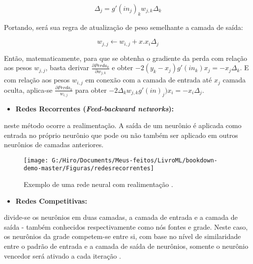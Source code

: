 \documentclass[
  openany]{book}
\providecommand{\tightlist}{%
  \setlength{\itemsep}{0pt}\setlength{\parskip}{0pt}}
\begin{document}
\begin{equation} 
  \Delta_j=g'(in_j)_k w_{j,k} \Delta_k
  \label{eq:deltaj}
\end{equation}

Portando, será sua regra de atualização de peso semelhante a camada de saída:

\begin{equation} 
  w_{j,j}\leftarrow w_{i,j}+x.x_i \Delta_j
  \label{eq:pesoatualizaCAOj}
\end{equation}

Então, matematicamente, para que se obtenha o gradiente da perda com relação aos pesos \(w_{j,j}\), basta derivar \(\frac{\partial Perda_k}{\partial w_{j,k}}\) e obter \(-2(y_k-x_j)g'(in_k)x_j=-x_j\Delta_k\). E com relação aos pesos \(w_{i,j}\) em conexão com a camada de entrada até \(x_j\) camada oculta, aplica-se \(\frac{\partial Perda_k}{w_{i,j}}\) para obter \(-2\Delta_k w_{j,k}g'(in)_j)x_i=-x_i \Delta_j\).

\begin{itemize}
\tightlist
\item
  \textbf{Redes Recorrentes (\emph{Feed-backward networks}):}
\end{itemize}

neste método ocorre a realimentação. A saída de um neurônio é aplicada como entrada no próprio neurônio que pode ou não também ser aplicado em outros neurônios de camadas anteriores.

\begin{figure}

{\centering \texttt{[image: G:/Hiro/Documents/Meus-feitos/LivroML/bookdown-demo-master/Figuras/redesrecorrentes]} 

}

\caption{Exemplo de uma rede neural com realimentação \citep{redesandre}.}\label{fig:redesrecorrentes}
\end{figure}



\begin{itemize}
\tightlist
\item
  \textbf{Redes Competitivas:}
\end{itemize}

divide-se os neurônios em duas camadas, a camada de entrada e a camada de saída - também conhecidos respectivamente como nós
fontes e grade. Neste caso, os neurônios da grade competem-se entre si, com base no nível de similaridade entre o padrão de entrada e a camada de saída de neurônios, somente o neurônio vencedor será ativado a cada iteração \citep{basheer2000artificial}.
\end{document}
